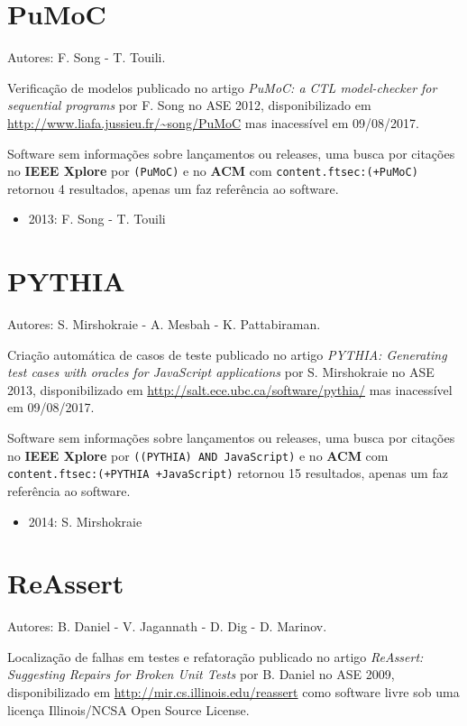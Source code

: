 \section{PuMoC}

Autores:
F. Song - T. Touili.

Verificação de modelos
publicado no artigo {\it PuMoC: a CTL model-checker for sequential programs}
por F. Song
no ASE 2012,
disponibilizado em \url{http://www.liafa.jussieu.fr/~song/PuMoC}
mas inacessível em 09/08/2017.

Software sem informações sobre lançamentos ou releases,
uma busca por citações no {\bf IEEE Xplore} por
\texttt{(PuMoC)}
e no {\bf ACM} com
\texttt{content.ftsec:(+PuMoC)}
retornou
4 resultados,
apenas um faz referência ao software.

\begin{itemize}
\item 2013: F. Song - T. Touili
\end{itemize}

\section{PYTHIA}

Autores:
S. Mirshokraie - A. Mesbah - K. Pattabiraman.

Criação automática de casos de teste
publicado no artigo {\it PYTHIA: Generating test cases with oracles for JavaScript applications}
por S. Mirshokraie
no ASE 2013,
disponibilizado em \url{http://salt.ece.ubc.ca/software/pythia/}
mas inacessível em 09/08/2017.

Software sem informações sobre lançamentos ou releases,
uma busca por citações no {\bf IEEE Xplore} por
\texttt{((PYTHIA) AND JavaScript)}
e no {\bf ACM} com
\texttt{content.ftsec:(+PYTHIA +JavaScript)}
retornou
15 resultados,
apenas um faz referência ao software.

\begin{itemize}
\item 2014: S. Mirshokraie
\end{itemize}

\section{ReAssert}

Autores:
B. Daniel - V. Jagannath - D. Dig - D. Marinov.

Localização de falhas em testes e refatoração
publicado no artigo {\it ReAssert: Suggesting Repairs for Broken Unit Tests}
por B. Daniel
no ASE 2009,
disponibilizado em \url{http://mir.cs.illinois.edu/reassert}
como software livre
sob uma licença Illinois/NCSA Open Source License.

